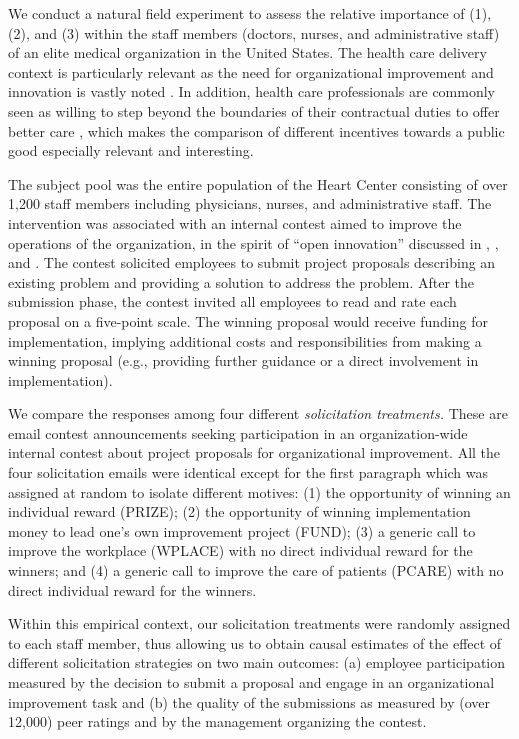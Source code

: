 \documentclass[12pt, titlepage]{article}
\begin{document}
We conduct a natural field experiment to assess the relative importance
of (1), (2), and (3) within the staff members (doctors, nurses, and
administrative staff) of an elite medical organization in the United
States. The health care delivery context is particularly relevant as the
need for organizational improvement and innovation is vastly noted
\citep{cutler2012reducing}. In addition, health care professionals are
commonly seen as willing to step beyond the boundaries of their
contractual duties to offer better care \citep{delfgaauw2005dedicated},
which makes the comparison of different incentives towards a public good
especially relevant and interesting.

The subject pool was the entire population of the Heart Center
consisting of over 1,200 staff members including physicians, nurses, and
administrative staff. The intervention was associated with an internal
contest aimed to improve the operations of the organization, in the
spirit of ``open innovation'' discussed in
\citet{terwiesch2008innovation}, \citet{lakhani2013prize}, and
\citet{glaeser2016predictive}. The contest solicited employees to submit
project proposals describing an existing problem and providing a
solution to address the problem. After the submission phase, the contest
invited all employees to read and rate each proposal on a five-point
scale. The winning proposal would receive funding for implementation,
implying additional costs and responsibilities from making a winning
proposal (e.g., providing further guidance or a direct involvement in
implementation).

We compare the responses among four different \emph{solicitation
treatments.} These are email contest announcements seeking participation
in an organization-wide internal contest about project proposals for
organizational improvement. All the four solicitation emails were
identical except for the first paragraph which was assigned at random to
isolate different motives: (1) the opportunity of winning an individual
reward (PRIZE); (2) the opportunity of winning implementation money to
lead one's own improvement project (FUND); (3) a generic call to improve
the workplace (WPLACE) with no direct individual reward for the winners;
and (4) a generic call to improve the care of patients (PCARE) with no
direct individual reward for the winners.

Within this empirical context, our solicitation treatments were randomly
assigned to each staff member, thus allowing us to obtain causal
estimates of the effect of different solicitation strategies on two main
outcomes: (a) employee participation measured by the decision to submit
a proposal and engage in an organizational improvement task and (b) the
quality of the submissions as measured by (over 12,000) peer ratings and
by the management organizing the contest.
\end{document}
